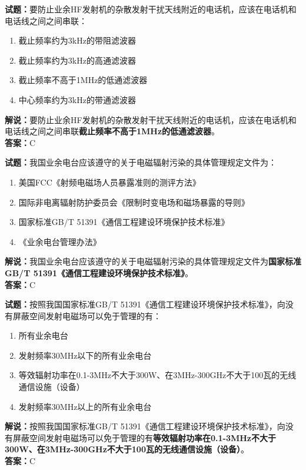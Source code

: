 \documentclass{ctexbook}
\begin{document}
\bigskip


\noindent\textbf{试题：}要防止业余HF发射机的杂散发射干扰天线附近的电话机，应该在电话机和电话线之间之间串联：
\begin{enumerate}[leftmargin=3em]	
	\item 截止频率约为3kHz的带阻滤波器
	\item 截止频率约为3kHz的高通滤波器
	\item 截止频率不高于1MHz的低通滤波器
	\item 中心频率约为3kHz的带通滤波器
\end{enumerate}
\noindent\textbf{解说：}要防止业余HF发射机的杂散发射干扰天线附近的电话机，应该在电话机和电话线之间之间串联\textbf{截止频率不高于1MHz的低通滤波器}。\\\noindent
\textbf{答案：}C

\bigskip


\noindent\textbf{试题：}我国业余电台应该遵守的关于电磁辐射污染的具体管理规定文件为： 
\begin{enumerate}[leftmargin=3em]
	\item 美国FCC《射频电磁场人员暴露准则的测评方法》
	\item 国际非电离辐射防护委员会《限制时变电场和磁场暴露的导则》
	\item 国家标准GB/T 51391《通信工程建设环境保护技术标准》
	\item 《业余电台管理办法》
\end{enumerate}
\noindent\textbf{解说：}我国业余电台应该遵守的关于电磁辐射污染的具体管理规定文件为\textbf{国家标准GB/T 51391《通信工程建设环境保护技术标准》}。\\\textbf{答案：}C

\bigskip


\noindent\textbf{试题：}按照我国国家标准GB/T 51391《通信工程建设环境保护技术标准》，向没有屏蔽空间发射电磁场可以免于管理的有： 
\begin{enumerate}[leftmargin=3em]
	\item 所有业余电台
	\item 发射频率30MHz以下的所有业余电台
	\item 等效辐射功率在0.1-3MHz不大于300W、在3MHz-300GHz不大于100瓦的无线通信设施（设备）
	\item 发射频率30MHz以上的所有业余电台
\end{enumerate}
\noindent\textbf{解说：}按照我国国家标准GB/T 51391《通信工程建设环境保护技术标准》，向没有屏蔽空间发射电磁场可以免于管理的有\textbf{等效辐射功率在0.1-3MHz不大于300W、在3MHz-300GHz不大于100瓦的无线通信设施（设备）}。\\\textbf{答案：}C
\end{document}
